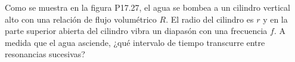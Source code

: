 \item Como se muestra en la figura P17.27, el agua se bombea a un cilindro vertical alto con una relación de flujo volumétrico $R$. El radio del cilindro es $r$ y en la parte superior abierta del cilindro vibra un diapasón con una frecuencia $f$. A medida que el agua asciende, ¿qué intervalo de tiempo transcurre entre resonancias sucesivas?